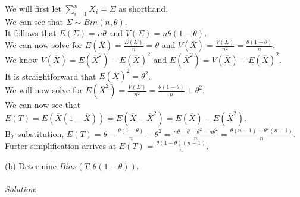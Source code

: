 \documentclass[12pt]{article}
\begin{document}
\noindent 
We will first let $ \displaystyle \sum_{i=1}^{n} X_{i} = \Sigma $ as shorthand. \\

\noindent 
We can see that $ \displaystyle \Sigma \sim Bin(n, \theta) $. \\

\noindent
It follows that $ E(\Sigma) = n\theta $ and $ V(\Sigma) = n\theta(1 - \theta) $. \\

\noindent
We can now solve for $ \displaystyle E(\overline{X}) = \frac{E(\Sigma)}{n} = \theta $ and $ \displaystyle V(\overline{X}) = \frac{V(\Sigma)}{n^2} = \frac{\theta(1 - \theta)}{n} $. \\

\noindent
We know $ V(\overline{X}) = E(\overline{X}^{2}) - E(\overline{X})^{2} $ and $ E(\overline{X}^{2}) = V(\overline{X}) + E(\overline{X})^{2} $. \\

\noindent
It is straightforward that $ E(\overline{X})^{2} = \theta^{2} $. \\

\noindent
We will now solve for $ \displaystyle E(\overline{X}^{2}) = \frac{V(\Sigma)}{n^2} = \frac{\theta(1 - \theta)}{n} + \theta^{2} $. \\

\noindent
We can now see that $ E(T) = E(\overline{X}(1 - \overline{X})) = E(\overline{X} - \overline{X}^{2}) = E(\overline{X}) - E(\overline{X}^2) $. \\

\noindent
By substitution, $ \displaystyle E(T) = \theta - \frac{\theta(1 - \theta)}{n} - \theta^{2} = \frac{n\theta - \theta + \theta^{2} - n\theta^{2}}{n} = \frac{\theta(n - 1) - \theta^{2}(n - 1)}{n} $. \\

\noindent
Furter simplification arrives at $ \displaystyle E(T) = \frac{\theta(1 - \theta)(n - 1)}{n} $. \\
\newpage


(b) Determine $ Bias(T; \theta(1 - \theta)) $. \\
\vspace{2.5mm} \\
\textit{Solution}:
\vspace{2.5mm} \\
\end{document}
